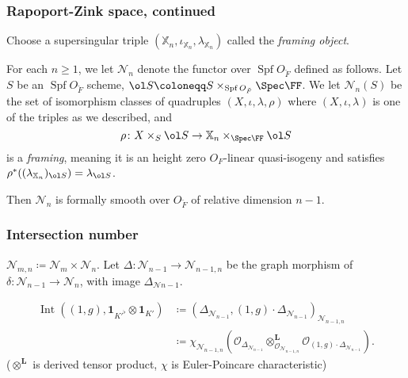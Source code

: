 \documentclass[11pt]{beamer}
\DeclareMathOperator{\Int}{Int}
\DeclareMathOperator{\Spf}{Spf}
\newcommand{\XX}{\mathbb{X}}
\renewcommand{\OO}{O}
\newcommand{\RZ}{\mathcal{N}}
\newcommand{\Sheaf}{\mathcal O}
\newcommand{\jiao}{\mathop{\otimes}^{\mathbf{L}}} %
\begin{document}
\begin{frame}
  \frametitle{Rapoport-Zink space, continued}
  Choose a supersingular triple $(\XX_n, \iota_{\XX_n}, \lambda_{\XX_n})$
  called the \emph{framing object}.
  \begin{definition}
    For each $n \ge 1$, we let $\RZ_n$ denote the
    functor over $\Spf \OO_{\breve F}$ defined as follows.
    Let $S$ be an $\Spf \OO_{\breve F}$ scheme,
    $\ol S \coloneqq S \times_{\Spf \OO_{\breve F}} \Spec \FF$.
    We let $\RZ_n(S)$ be the set of isomorphism classes of quadruples
    $(X, \iota, \lambda, \rho)$
    where $(X, \iota, \lambda)$ is one of the triples as we described, and
    \[ \rho \colon X \times_S \ol S \to \XX_n \times_{\Spec \FF} \ol S \]
    is a \emph{framing}, meaning it is an height zero $\OO_F$-linear quasi-isogeny
    and satisfies $\rho^\ast((\lambda_{\XX_n})_{\ol S}) = \lambda_{\ol S}$.
  \end{definition}
  Then $\RZ_n$ is formally smooth over $\OO_{\breve F}$ of relative dimension $n-1$.

\end{frame}
\begin{frame}
  \frametitle{Intersection number}
  \begin{itemize}
    \ii $\RZ_{m,n} \coloneqq \RZ_m \times \RZ_n$.
    \ii Let $\Delta \colon \RZ_{n-1} \to \RZ_{n-1,n}$
    be the graph morphism of $\delta \colon \RZ_{n-1} \to \RZ_n$,
    with image $\Delta_{\RZ{n-1}}$.
  \end{itemize}

  \begin{definition}
    \begin{align*}
      \Int((1,g), \mathbf{1}_{K'^\flat} \otimes \mathbf{1}_{K'})
      &\coloneqq \left( \Delta_{\RZ_{n-1}}, (1,g) \cdot \Delta_{\RZ_{n-1}} \right)_{\RZ_{n-1,n}} \\
      &\coloneqq \chi_{\RZ_{n-1,n}}
      \left( \Sheaf_{\Delta_{\RZ_{n-1}}} \jiao_{\Sheaf_{\RZ_{n-1,n}}} \Sheaf_{(1,g) \cdot \Delta_{\RZ_{n-1}}} \right) .
    \end{align*}
    ($\jiao$ is derived tensor product, $\chi$ is Euler-Poincare characteristic)
  \end{definition}

\end{frame}
\end{document}
